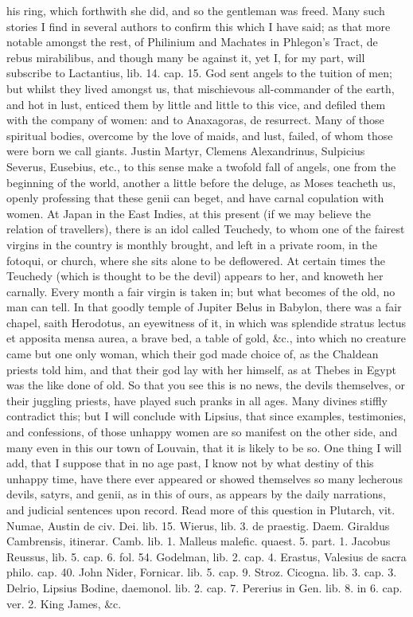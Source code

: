 {his ring, which forthwith she did, and so the gentleman was freed. Many
such stories I find in several authors to confirm this which I
have said; as that more notable amongst the rest, of Philinium and
Machates in Phlegon's Tract, de rebus mirabilibus, and though
many be against it, yet I, for my part, will subscribe to Lactantius,
lib. 14. cap. 15. God sent angels to the tuition of men; but
whilst they lived amongst us, that mischievous all-commander of the
earth, and hot in lust, enticed them by little and little to this vice,
and defiled them with the company of women: and to Anaxagoras, de
resurrect. Many of those spiritual bodies, overcome by the love
of maids, and lust, failed, of whom those were born we call giants.
Justin Martyr, Clemens Alexandrinus, Sulpicius Severus, Eusebius, etc.,
to this sense make a twofold fall of angels, one from the beginning of
the world, another a little before the deluge, as Moses teacheth us,
openly professing that these genii can beget, and have carnal
copulation with women. At Japan in the East Indies, at this present (if
we may believe the relation of travellers), there is an idol
called Teuchedy, to whom one of the fairest virgins in the country is
monthly brought, and left in a private room, in the fotoqui, or church,
where she sits alone to be deflowered. At certain times the
Teuchedy (which is thought to be the devil) appears to her, and knoweth
her carnally. Every month a fair virgin is taken in; but what becomes
of the old, no man can tell. In that goodly temple of Jupiter Belus in
Babylon, there was a fair chapel, saith Herodotus, an eyewitness
of it, in which was splendide stratus lectus et apposita mensa aurea, a
brave bed, a table of gold, \&c., into which no creature came but one
only woman, which their god made choice of, as the Chaldean priests
told him, and that their god lay with her himself, as at Thebes in
Egypt was the like done of old. So that you see this is no news, the
devils themselves, or their juggling priests, have played such pranks
in all ages. Many divines stiffly contradict this; but I will conclude
with Lipsius, that since examples, testimonies, and confessions,
of those unhappy women are so manifest on the other side, and many even
in this our town of Louvain, that it is likely to be so. One
thing I will add, that I suppose that in no age past, I know not by
what destiny of this unhappy time, have there ever appeared or showed
themselves so many lecherous devils, satyrs, and genii, as in this of
ours, as appears by the daily narrations, and judicial sentences upon
record. Read more of this question in Plutarch, vit. Numae, Austin de
civ. Dei. lib. 15. Wierus, lib. 3. de praestig. Daem. Giraldus
Cambrensis, itinerar. Camb. lib. 1. Malleus malefic. quaest. 5. part.
1. Jacobus Reussus, lib. 5. cap. 6. fol. 54. Godelman, lib. 2. cap. 4.
Erastus, Valesius de sacra philo. cap. 40. John Nider, Fornicar. lib.
5. cap. 9. Stroz. Cicogna. lib. 3. cap. 3. Delrio, Lipsius Bodine,
daemonol. lib. 2. cap. 7. Pererius in Gen. lib. 8. in 6. cap. ver. 2.
King James, \&c.

}
